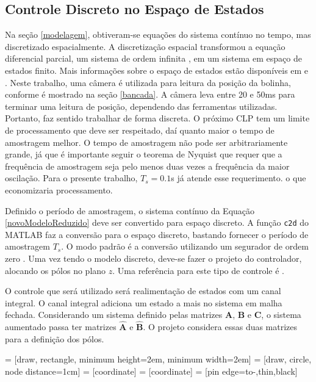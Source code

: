 \subsection{Controle Discreto no Espaço de Estados}
 Na seção \ref{modelagem}, obtiveram-se equações do sistema contínuo no tempo, mas discretizado espacialmente. A discretização espacial transformou a equação diferencial parcial, um sistema de ordem infinita \cite{fabricioIFAC}, em um sistema em espaço de estados finito. Mais informações sobre o espaço de estados estão disponíveis em \cite{Ogata:2010} e \cite{OgataDiscrete:1995}. 
 Neste trabalho, uma câmera é utilizada para leitura da posição da bolinha, conforme é mostrado na seção \ref{bancada}. A câmera leva entre 20 e 50ms para terminar uma leitura de posição, dependendo das ferramentas utilizadas. Portanto, faz sentido trabalhar de forma discreta. O próximo CLP tem um limite de processamento que deve ser respeitado, daí quanto maior o tempo de amostragem melhor. O tempo de amostragem não pode ser arbitrariamente grande, já que é importante seguir o teorema de Nyquist \cite{Ogata:2010} que requer que a frequência de amostragem seja pelo menos duas vezes a frequência da maior oscilação. Para o presente trabalho, $T_s = 0.1$s já atende esse requerimento. o que economizaria processamento.

 Definido o período de amostragem, o sistema contínuo da Equação \ref{novoModeloReduzido} deve ser convertido para espaço discreto. A função \texttt{c2d} do MATLAB \cite{c2d} faz a conversão para o espaço discreto, bastando fornecer o período de amostragem $T_s$. O modo padrão é a conversão utilizando um segurador de ordem zero \cite{OgataDiscrete:1995}. Uma vez tendo o modelo discreto, deve-se fazer o projeto do controlador, alocando os pólos no plano $z$. Uma referência para este tipo de controle é \cite{OgataDiscrete:1995}.

 O controle que será utilizado será realimentação de estados com um canal integral. O canal integral adiciona um estado a mais no sistema em malha fechada. Considerando um sistema definido pelas matrizes $\mathbf{A}$, $\mathbf{B}$ e $\mathbf{C}$, o sistema aumentado passa ter matrizes $\mathbf{\hat{A}}$ e $\mathbf{\hat{B}}$. O projeto considera essas duas matrizes para a definição dos pólos.

 = [draw, rectangle, 
minimum height=2em, minimum width=2em]
 = [draw, circle, node distance=1cm]
 = [coordinate]
 = [coordinate]
 = [pin edge={to-,thin,black}]

